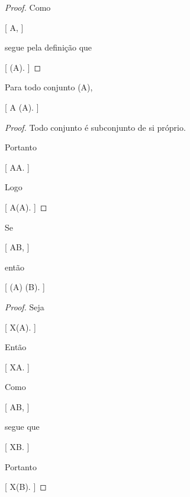\documentclass[../../main]{subfiles}
\begin{document}
\begin{proof}

	Como

	[
	\varnothing\subseteq A,
	]

	segue pela definição que

		[
			\varnothing\in{}(A).
		]

\end{proof}

\begin{prop}
	\label{prop:matematica:teoria-conjuntos:conjunto-das-partes:proprio}

	Para todo conjunto (A),

	[
			A
			\in
			(A).
		]

\end{prop}

\begin{proof}

	Todo conjunto é subconjunto de si próprio.

	Portanto

		[
			A\subseteq A.
		]

	Logo

		[
			A\in{}(A).
		]

\end{proof}

\begin{prop}[Monotonicidade]
	\label{prop:matematica:teoria-conjuntos:conjunto-das-partes:monotonicidade}

	Se

		[
			A\subseteq B,
		]

	então

	[
	(A)
	\subseteq
	(B).
	]

\end{prop}

\begin{proof}

	Seja

	[
	X\in{}(A).
	]

	Então

	[
	X\subseteq A.
	]

	Como

		[
			A\subseteq B,
		]

	segue que

		[
			X\subseteq B.
		]

	Portanto

		[
			X\in{}(B).
		]

\end{proof}
\end{document}
